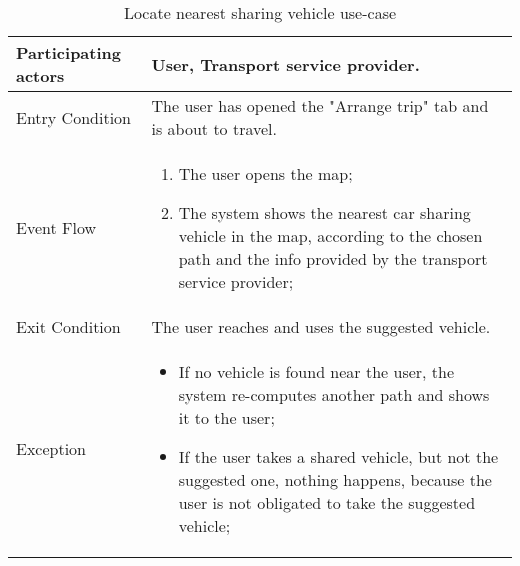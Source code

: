 \begin{table}[H]
	\begin{center}
		\begin{tabular}{ | p{} | p{} | }
		\hline
		Participating actors &  User, Transport service provider.\\
		\hline
		Entry Condition & The user has opened the "Arrange trip" tab and is about to travel.\\
		\hline
		Event Flow & 
			\begin{enumerate}
				\item The user opens the map;
				\item The system shows the nearest car sharing vehicle in the map, according to the chosen path and the info provided by the transport service provider;
			\end{enumerate} \\
		\hline
		Exit Condition & The user reaches and uses the suggested vehicle. \\
		\hline
		Exception &
				\begin{itemize}
   					\item If no vehicle is found near the user, the system re-computes another path and shows it to the user;
   					\item If the user takes a shared vehicle, but not the suggested one, nothing happens, because the user is not obligated to take the suggested vehicle;
   				\end{itemize} \\ 
		\hline
		\end{tabular}
	\end{center}
	\caption{Locate nearest sharing vehicle use-case}
\end{table}